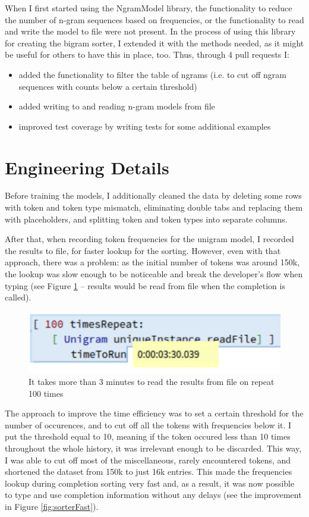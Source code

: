 When I first started using the NgramModel library, the functionality to reduce the number of n-gram sequences based on frequencies, or the functionality to read and write the model to file were not present. In the process of using this library for creating the bigram sorter, I extended it with the methods needed, as it might be useful for others to have this in place, too. Thus, through 4 pull requests I:
\begin{itemize}
    \item added the functionality to filter the table of ngrams (i.e. to cut off ngram sequences with counts below a certain threshold)
    \item added writing to and reading n-gram models from file
    \item improved test coverage by writing tests for some additional examples
\end{itemize}

\section{Engineering Details}
\label{sec:ProposedSolution-Engineering}
Before training the models, I additionally cleaned the data by deleting some rows with token and token type mismatch, eliminating double tabs and replacing them with placeholders, and splitting token and token types into separate columns.

After that, when recording token frequencies for the unigram model, I recorded the results to file, for faster lookup for the sorting. However, even with that approach, there was a problem: as the initial number of tokens was around 150k, the lookup was slow enough to be noticeable and break the developer's flow when typing (see Figure \ref{fig:sorterSlow} -- results would be read from file when the completion is called).

\begin{figure}[H]
    \centering
    \includegraphics[width=0.7\linewidth]{images/unigramTimeToRunSlow.png}
    \caption{It takes more than 3 minutes to read the results from file on repeat 100 times}
    \label{fig:sorterSlow}
\end{figure}

The approach to improve the time efficiency was to set a certain threshold for the number of occurences, and to cut off all the tokens with frequencies below it. I put the threshold equal to 10, meaning if the token occured less than 10 times throughout the whole history, it was irrelevant enough to be discarded. This way, I was able to cut off most of the miscellaneous, rarely encountered tokens, and shortened the dataset from 150k to just 16k entries. This made the frequencies lookup during completion sorting very fast and, as a result, it was now possible to type and use completion information without any delays (see the improvement in Figure \ref{fig:sorterFast}).

